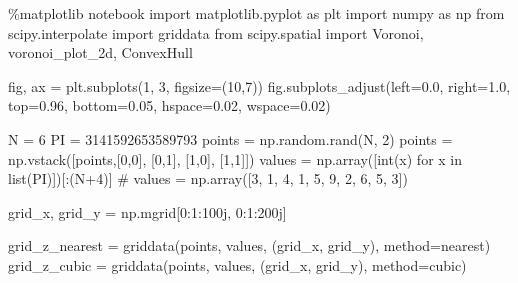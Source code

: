 \documentclass[
  letterpaper,
  DIV=11,
  numbers=noendperiod]{scrreprt}
\newenvironment{Shaded}{\begin{snugshade}}{\end{snugshade}}
\newcommand{\BuiltInTok}[1]{\textcolor[rgb]{0.00,0.23,0.31}{#1}}
\newcommand{\CommentTok}[1]{\textcolor[rgb]{0.37,0.37,0.37}{#1}}
\newcommand{\ControlFlowTok}[1]{\textcolor[rgb]{0.00,0.23,0.31}{#1}}
\newcommand{\DecValTok}[1]{\textcolor[rgb]{0.68,0.00,0.00}{#1}}
\newcommand{\FloatTok}[1]{\textcolor[rgb]{0.68,0.00,0.00}{#1}}
\newcommand{\ImportTok}[1]{\textcolor[rgb]{0.00,0.46,0.62}{#1}}
\newcommand{\KeywordTok}[1]{\textcolor[rgb]{0.00,0.23,0.31}{#1}}
\newcommand{\NormalTok}[1]{\textcolor[rgb]{0.00,0.23,0.31}{#1}}
\newcommand{\OperatorTok}[1]{\textcolor[rgb]{0.37,0.37,0.37}{#1}}
\newcommand{\OtherTok}[1]{\textcolor[rgb]{0.00,0.23,0.31}{#1}}
\newcommand{\StringTok}[1]{\textcolor[rgb]{0.13,0.47,0.30}{#1}}
\begin{document}
\begin{Shaded}
\begin{Highlighting}[]
\OperatorTok{\%}\NormalTok{matplotlib notebook}
\ImportTok{import}\NormalTok{ matplotlib.pyplot }\ImportTok{as}\NormalTok{ plt}
\ImportTok{import}\NormalTok{ numpy }\ImportTok{as}\NormalTok{ np}
\ImportTok{from}\NormalTok{ scipy.interpolate }\ImportTok{import}\NormalTok{ griddata}
\ImportTok{from}\NormalTok{ scipy.spatial }\ImportTok{import}\NormalTok{ Voronoi, voronoi\_plot\_2d, ConvexHull}

\NormalTok{fig, ax }\OperatorTok{=}\NormalTok{ plt.subplots(}\DecValTok{1}\NormalTok{, }\DecValTok{3}\NormalTok{, figsize}\OperatorTok{=}\NormalTok{(}\DecValTok{10}\NormalTok{,}\DecValTok{7}\NormalTok{))}
\NormalTok{fig.subplots\_adjust(left}\OperatorTok{=}\FloatTok{0.0}\NormalTok{, right}\OperatorTok{=}\FloatTok{1.0}\NormalTok{, top}\OperatorTok{=}\FloatTok{0.96}\NormalTok{, bottom}\OperatorTok{=}\FloatTok{0.05}\NormalTok{,}
\NormalTok{                    hspace}\OperatorTok{=}\FloatTok{0.02}\NormalTok{, wspace}\OperatorTok{=}\FloatTok{0.02}\NormalTok{)}

\NormalTok{N }\OperatorTok{=} \DecValTok{6}
\NormalTok{PI }\OperatorTok{=} \StringTok{\textquotesingle{}3141592653589793\textquotesingle{}}
\NormalTok{points }\OperatorTok{=}\NormalTok{ np.random.rand(N, }\DecValTok{2}\NormalTok{)}
\NormalTok{points }\OperatorTok{=}\NormalTok{ np.vstack([points,[}\DecValTok{0}\NormalTok{,}\DecValTok{0}\NormalTok{], [}\DecValTok{0}\NormalTok{,}\DecValTok{1}\NormalTok{], [}\DecValTok{1}\NormalTok{,}\DecValTok{0}\NormalTok{], [}\DecValTok{1}\NormalTok{,}\DecValTok{1}\NormalTok{]])}
\NormalTok{values }\OperatorTok{=}\NormalTok{ np.array([}\BuiltInTok{int}\NormalTok{(x) }\ControlFlowTok{for}\NormalTok{ x }\KeywordTok{in} \BuiltInTok{list}\NormalTok{(PI)])[:(N}\OperatorTok{+}\DecValTok{4}\NormalTok{)]}
\CommentTok{\# values = np.array([3, 1, 4, 1, 5, 9, 2, 6, 5, 3])}

\NormalTok{grid\_x, grid\_y }\OperatorTok{=}\NormalTok{ np.mgrid[}\DecValTok{0}\NormalTok{:}\DecValTok{1}\NormalTok{:}\OtherTok{100j}\NormalTok{, }\DecValTok{0}\NormalTok{:}\DecValTok{1}\NormalTok{:}\OtherTok{200j}\NormalTok{]}

\NormalTok{grid\_z\_nearest }\OperatorTok{=}\NormalTok{ griddata(points, values, (grid\_x, grid\_y), method}\OperatorTok{=}\StringTok{\textquotesingle{}nearest\textquotesingle{}}\NormalTok{)}
\NormalTok{grid\_z\_cubic }\OperatorTok{=}\NormalTok{ griddata(points, values, (grid\_x, grid\_y), method}\OperatorTok{=}\StringTok{\textquotesingle{}cubic\textquotesingle{}}\NormalTok{)}


\end{Highlighting}
\end{Shaded}
\end{document}
